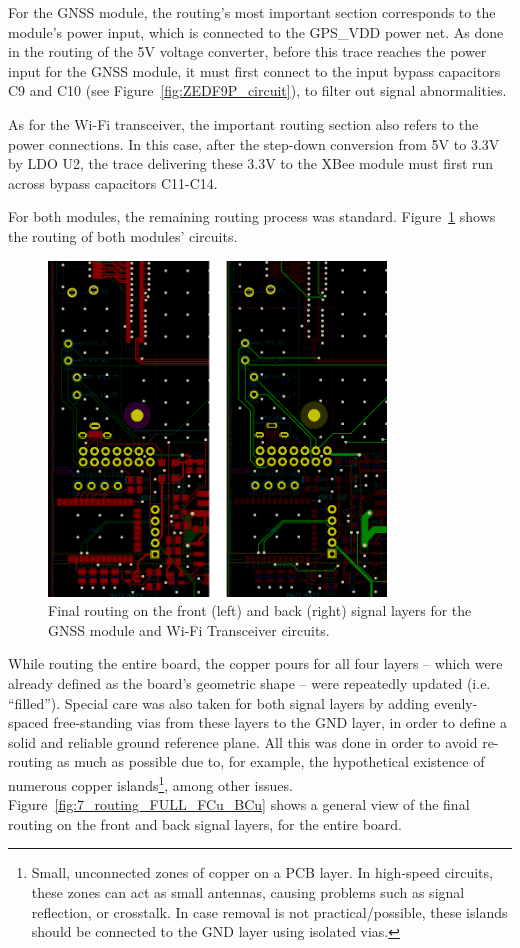 For the GNSS module, the routing's most important section corresponds to the module's power input, which is connected to the GPS\_VDD power net. As done in the routing of the 5V voltage converter, before this trace reaches the power input for the GNSS module, it must first connect to the input bypass capacitors C9 and C10 (see Figure~\ref{fig:ZEDF9P_circuit}), to filter out signal abnormalities.

As for the Wi-Fi transceiver, the important routing section also refers to the power connections. In this case, after the step-down conversion from 5V to 3.3V by LDO U2, the trace delivering these 3.3V to the XBee module must first run across bypass capacitors C11-C14.

For both modules, the remaining routing process was standard. Figure~\ref{fig:6_routing_ZED_XBee} shows the routing of both modules' circuits.

\begin{figure}[h]
	\centering
	\includegraphics[width=0.8\textwidth]{Chapters/Figures/chapter5/6_routing_ZED_XBee.png}
	\caption{Final routing on the front (left) and back (right) signal layers for the GNSS module and Wi-Fi Transceiver circuits.}
	\label{fig:6_routing_ZED_XBee}
\end{figure}

While routing the entire board, the copper pours for all four layers -- which were already defined as the board's geometric shape -- were repeatedly updated (i.e. ``filled''). Special care was also taken for both signal layers by adding evenly-spaced free-standing vias from these layers to the GND layer, in order to define a solid and reliable ground reference plane. All this was done in order to avoid re-routing as much as possible due to, for example, the hypothetical existence of numerous copper islands\footnote[21]{Small, unconnected zones of copper on a PCB layer. In high-speed circuits, these zones can act as small antennas, causing problems such as signal reflection, or crosstalk. In case removal is not practical/possible, these islands should be connected to the GND layer using isolated vias.}, among other issues. Figure~\ref{fig:7_routing_FULL_FCu_BCu} shows a general view of the final routing on the front and back signal layers, for the entire board.

